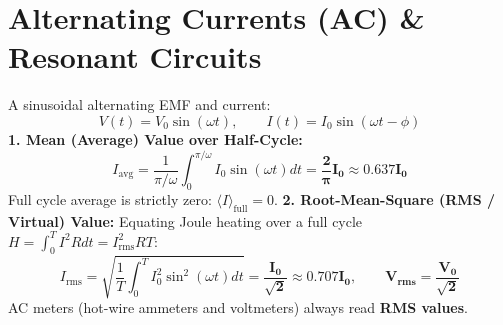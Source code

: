 \documentclass[10pt,twoside,openright]{book}
\begin{document}
\section{Alternating Currents (AC) \& Resonant Circuits}

\begin{conceptbox}
A sinusoidal alternating EMF and current:
\begin{equation}
  V(t) = V_0 \sin(\omega t), \qquad I(t) = I_0 \sin(\omega t - \phi)
\end{equation}
\textbf{1. Mean (Average) Value over Half-Cycle:}
\begin{equation}
  I_{\text{avg}} = \frac{1}{\pi/\omega} \int_0^{\pi/\omega} I_0 \sin(\omega t) dt = \mathbf{\frac{2}{\pi} I_0 \approx 0.637 I_0}
\end{equation}
Full cycle average is strictly zero: $\langle I \rangle_{\text{full}} = 0$.
\textbf{2. Root-Mean-Square (RMS / Virtual) Value:}
Equating Joule heating over a full cycle $H = \int_0^T I^2 R dt = I_{\text{rms}}^2 R T$:
\begin{equation}
  I_{\text{rms}} = \sqrt{\frac{1}{T} \int_0^T I_0^2 \sin^2(\omega t) dt} = \mathbf{\frac{I_0}{\sqrt{2}} \approx 0.707 I_0}, \qquad \mathbf{V_{\text{rms}} = \frac{V_0}{\sqrt{2}}}
\end{equation}
AC meters (hot-wire ammeters and voltmeters) always read \textbf{RMS values}.
\end{conceptbox}
\end{document}
